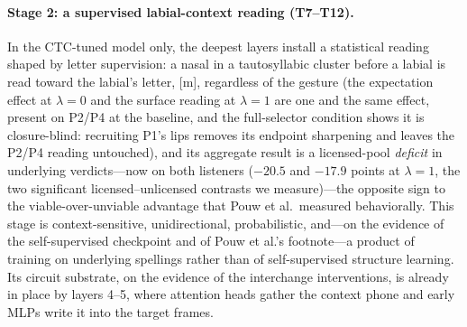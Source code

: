 \documentclass[11pt,a4paper]{article}
\newcommand{\lam}{\lambda}
\begin{document}
\paragraph{Stage 2: a supervised labial-context reading
(T7--T12).}
In the CTC-tuned model only, the deepest layers install a statistical
reading shaped by letter supervision: a nasal in a tautosyllabic
cluster before a labial is read toward the labial's letter, [m],
regardless of the gesture (the expectation effect at $\lam=0$ and the
surface reading at $\lam=1$ are one and the same effect, present on
P2/P4 at the baseline, and the full-selector condition shows it is
closure-blind: recruiting P1's lips removes its endpoint sharpening
and leaves the P2/P4 reading untouched), and
its aggregate result is a licensed-pool \emph{deficit} in underlying
verdicts---now on both listeners ($-20.5$ and $-17.9$ points at
$\lam=1$, the two significant licensed--unlicensed contrasts we
measure)---the opposite sign to the
viable-over-unviable advantage that Pouw et al.\ measured behaviorally.
This stage is context-sensitive, unidirectional, probabilistic,
and---on the evidence of the self-supervised checkpoint and of Pouw et
al.'s footnote---a product of training on underlying spellings rather
than of self-supervised structure learning. Its circuit substrate, on
the evidence of the interchange interventions, is already in place by
layers 4--5, where attention heads gather the context phone and early
MLPs write it into the target frames.
\end{document}
